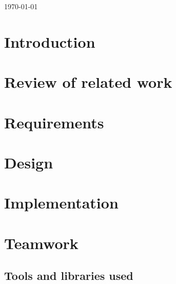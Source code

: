 \documentclass[a4paper,12pt]{article}
\begin{document}
\begin{titlepage}
{\large \today}\\[3cm] %


 

\vfill %

\end{titlepage}


\tableofcontents

\section{Introduction}

\section{Review of related work}

\section{Requirements}

\section{Design}

\section{Implementation}

\section{Teamwork}

\subsection{Tools and libraries used}
\end{document}
